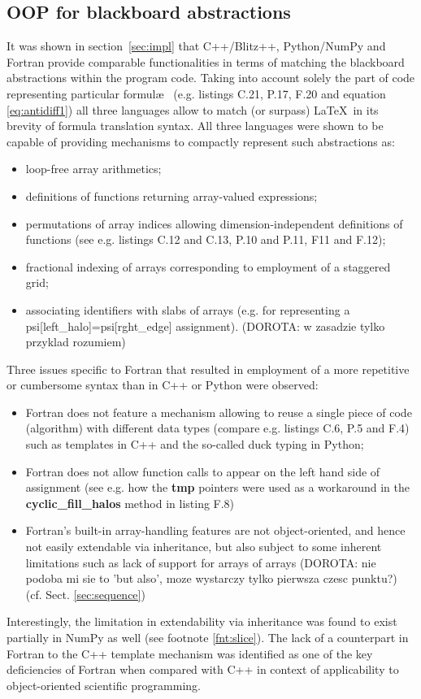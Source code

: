 \documentclass[final,5p,times,twocolumn]{elsarticle}
\newcommand{\prog}[1]{{\rm\bf#1}}
\begin{document}
  \subsection{OOP for blackboard abstractions}

  It was shown in section~\ref{sec:impl} that C++/Blitz++, Python/NumPy and Fortran
    provide comparable functionalities in terms of matching the blackboard abstractions
    within the program code.
  Taking into account solely the part of code representing particular formul\ae~
    (e.g. listings C.21, P.17, F.20 and equation \ref{eq:antidiff1}) all three
    languages allow to match (or surpass) \LaTeX~in its brevity of formula translation syntax.
  All three languages were shown to be capable of providing mechanisms to compactly represent such abstractions as:
  \begin{itemize}
    \item{loop-free array arithmetics;}
    \item{definitions of functions returning array-valued expressions;}
    \item{permutations of array indices allowing dimension-independent definitions
      of functions (see e.g. listings C.12 and C.13, P.10 and P.11, F11 and F.12);}
    \item{fractional indexing of arrays corresponding to employment of a staggered grid;}
    \item{associating identifiers with slabs of arrays (e.g. for representing 
      a psi[left\_halo]=psi[rght\_edge] assignment).} (DOROTA: w zasadzie tylko przyklad rozumiem)
  \end{itemize}
  Three issues specific to Fortran that 
    resulted in employment of a more repetitive or cumbersome syntax than in C++ or Python
    were observed:
  \begin{itemize}
    \item{Fortran does not feature a mechanism allowing to reuse a single piece of code (algorithm)
      with different data types (compare e.g. listings C.6, P.5 and F.4) such as
      templates in C++ and the so-called duck typing in Python;}
    \item{Fortran does not allow function calls to appear on the left hand side
      of assignment (see e.g. how the \prog{tmp} pointers were used as a workaround in the \prog{cyclic\_fill\_halos}
      method in listing F.8)}
    \item{Fortran's built-in array-handling features are not object-oriented,
      and hence not easily extendable via inheritance, but also subject to
      some inherent limitations such as lack of support for arrays of arrays
      (DOROTA: nie podoba mi sie to 'but also', moze wystarczy tylko pierwsza czesc punktu?)
      (cf. Sect. \ref{sec:sequence})}
  \end{itemize}
  Interestingly, the limitation in extendability via inheritance was found to
    exist partially in NumPy as well (see footnote \ref{fnt:slice}).
  The lack of a counterpart in Fortran to the C++ template mechanism was identified
    \citep{Cary_et_al_1997}
    as one of the key deficiencies of Fortran when compared with C++ in context 
    of applicability to object-oriented scientific programming.
\end{document}
